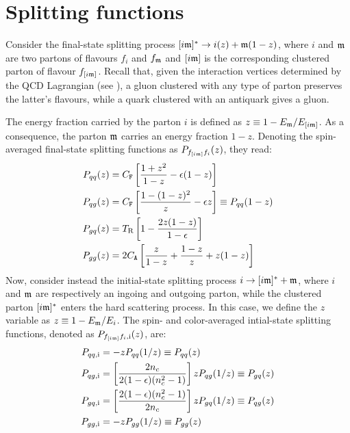 \section{Splitting functions}
\label{sec:spl-func}

Consider the final-state splitting process $ [i\mathfrak{m}]^* \rightarrow i(z) + \mathfrak{m}(1-z) $, where $ i $ and $ \mathfrak{m} $ are two partons of flavours $ f_i $ and $ f_{\mathfrak{m}} $ and $ [i\mathfrak{m}] $ is the corresponding clustered parton of flavour $ f_{[i\mathfrak{m}]} $. Recall that, given the interaction vertices determined by the QCD Lagrangian  (see ), a gluon clustered with any type of parton preserves the latter's flavours, while a quark clustered with an antiquark gives a gluon.

The energy fraction carried by the parton $ i $ is defined as $ z \equiv 1 - E_{\mathfrak{m}} / E_{[i\mathfrak{m}]} $. As a consequence, the parton $ \mathfrak{m} $ carries an energy fraction $ 1 - z $. Denoting the spin-averaged final-state splitting functions as $ P_{f_{[i\mathfrak{m}]}f_i}(z) $, they read:
\begin{align}
  P_{qq}(z) & = C_\mathtt{F} \left[ \frac{1 + z^2}{1 - z} - \epsilon (1 - z) \right] \label{eq:spl-1} \\
  P_{qg}(z) & = C_\mathtt{F} \left[ \frac{1 - (1 - z)^2}{z} - \epsilon z \right] \equiv P_{qq}(1 - z) \\
  P_{gq}(z) & = T_\text{R} \left[ 1 - \frac{2z (1 - z)}{1 - \epsilon} \right] \\
  P_{gg}(z) & = 2 C_\mathtt{A} \left[ \frac{z}{1 - z} + \frac{1 - z}{z} + z (1 - z) \right] \label{eq:spl-4}
\end{align}
Now, consider instead the initial-state splitting process $ i \rightarrow [i\mathfrak{m}]^* + \mathfrak{m} $, where $ i $ and $ \mathfrak{m} $ are respectively an ingoing and outgoing parton, while the clustered parton $ [i\mathfrak{m}]^* $ enters the hard scattering process. In this case, we define the $ z $ variable as $ z \equiv 1 - E_{\mathfrak{m}} / E_i $. The spin- and color-averaged intial-state splitting functions, denoted as $ P_{f_{[i\mathfrak{m}]}f_i, \text{i}}(z) $, are:
\begin{align}
  P_{qq,\text{i}} & = - z P_{qq}(1/z) \equiv P_{qq}(z) \label{eq:spli-1} \\
  P_{qg,\text{i}} & = \left[ \frac{2n_c}{2 (1 - \epsilon) (n_c^2 - 1)} \right] z P_{qg}(1/z) \equiv P_{gq}(z) \\
  P_{gq,\text{i}} & = \left[ \frac{2 (1 - \epsilon) (n_c^2 - 1)}{2n_c} \right] z P_{gq}(1/z) \equiv P_{qg}(z) \\
  P_{gg,\text{i}} & = - z P_{gg}(1/z) \equiv P_{gg}(z) \label{eq:spli-4}
\end{align}
